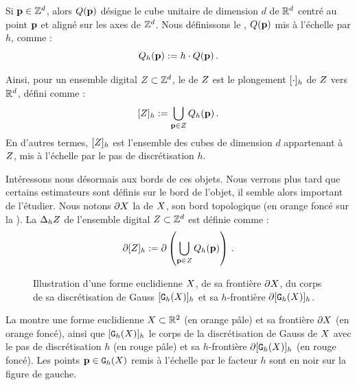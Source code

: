 Si $\mathbf{p} \in \mathbb{Z}^d$, alors $Q({\mathbf{p}})$ désigne le cube unitaire de dimension $d$ de
$\mathbb{R}^d$ centré au point $\mathbf{p}$ et aligné sur les axes de $\mathbb{Z}^d$. Nous définissons
le , \cad $Q({\mathbf{p}})$ mis à l'échelle par $h$, comme :
%
\begin{equation}
  Q_{h}({\mathbf{p}}) := h\cdot Q({\mathbf{p}}) \,.
\end{equation}


Ainsi, pour un ensemble digital $Z \subset \mathbb{Z}^d$, le  de
$Z$ est le plongement $\lbrack \cdot \rbrack_{h}$ de $Z$ vers $\mathbb{R}^d$,
défini comme :
%
\begin{equation}
  \lbrack Z \rbrack_{h} := \bigcup_{\mathbf{p} \in Z} Q_{h}({\mathbf{p}}) \,.
\end{equation}
%
En d'autres termes, $\lbrack Z \rbrack_{h}$ est l'ensemble des cubes de dimension
$d$ appartenant à $Z$, mis à l'échelle par le pas de discrétisation $h$.


Intéressons nous désormais aux bords de ces objets. Nous verrons plus tard que
certains estimateurs sont définis sur le bord de l'objet, il semble alors
important de l'étudier. Nous notons $\partial X$ la  de $X$,
\cad son bord topologique (en orange foncé sur la ). La
 $\Delta_{h} Z$ de l'ensemble digital $Z
\subset \mathbb{Z}^d$ est définie comme :
%
\begin{equation}
  \partial\lbrack Z \rbrack_{h} := \partial \left( \bigcup_{\mathbf{p} \in Z} Q_{h}({\mathbf{p}}) \right) \,.
\end{equation}
%


\begin{figure}[ht]
  \begin{center}
    
  \end{center}
  \caption{Illustration d'une forme euclidienne $X$, de sa frontière $\partial X$,
  du corps de sa discrétisation de Gauss $\lbrack \mathtt{G}_{h}(X) \rbrack_{h}$ et sa $h$-frontière
  $\partial\lbrack \mathtt{G}_{h}(X) \rbrack_{h}$.\label{fig:frontier}}
\end{figure}


La  montre une forme euclidienne $X \subset \mathbb{R}^2$
(en orange pâle) et sa frontière $\partial X$ (en orange foncé), ainsi que
$\lbrack \mathtt{G}_{h}(X) \rbrack_{h}$ le corps de la discrétisation de Gauss de $X$ avec le pas
de discrétisation $h$ (en rouge pâle) et sa $h$-frontière
$\partial\lbrack \mathtt{G}_{h}(X) \rbrack_{h}$ (en rouge foncé). Les points $\mathbf{p} \in \mathtt{G}_{h}(X)$ remis à
l'échelle par le facteur $h$ sont en noir sur la figure de gauche.


